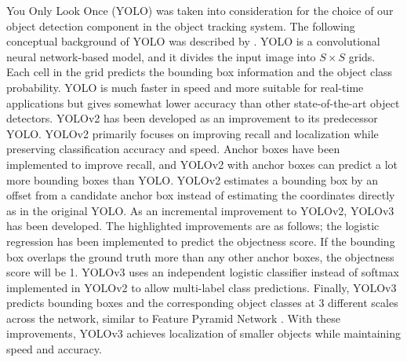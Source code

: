 You Only Look Once (YOLO) \cite{redmon_you_2016} was taken into consideration for the choice of our object detection component in the object tracking system. The following conceptual background of YOLO was described by \citeauthor{redmon_you_2016} \cite{redmon_you_2016}. YOLO is a convolutional neural network-based model, and it divides the input image into $S \times S$ grids. Each cell in the grid predicts the bounding box information and the object class probability. YOLO is much faster in speed and more suitable for real-time applications but gives somewhat lower accuracy than other state-of-the-art object detectors. YOLOv2 \cite{redmon_yolo9000_2017} has been developed as an improvement to its predecessor YOLO. YOLOv2 primarily focuses on improving recall and localization while preserving classification accuracy and speed. Anchor boxes have been implemented to improve recall, and YOLOv2 with anchor boxes can predict a lot more bounding boxes than YOLO. YOLOv2 estimates a bounding box by an offset from a candidate anchor box instead of estimating the coordinates directly as in the original YOLO. As an incremental improvement to YOLOv2, YOLOv3 \cite{redmon_yolov3_2018} has been developed. The highlighted improvements are as follows; the logistic regression has been implemented to predict the objectness score. If the bounding box overlaps the ground truth more than any other anchor boxes, the objectness score will be 1. YOLOv3 uses an independent logistic classifier instead of softmax implemented in YOLOv2 to allow multi-label class predictions. Finally, YOLOv3 predicts bounding boxes and the corresponding object classes at 3 different scales across the network, similar to Feature Pyramid Network \cite{lin_feature_2017}. With these improvements, YOLOv3 achieves localization of smaller objects while maintaining speed and accuracy.

